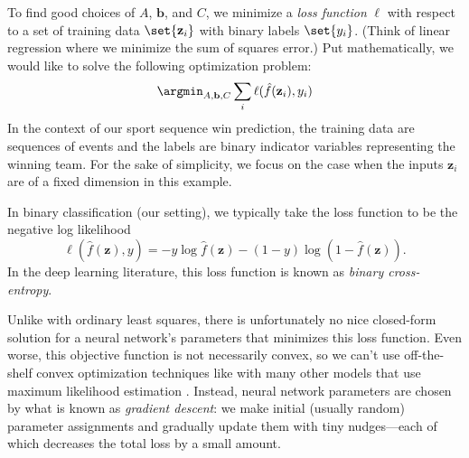 To find good choices of $A$, $\mathbf b$, and $C$, we minimize a \emph{loss function} $\ell$ with respect to a set of training data $\set{\mathbf z_i}$ with binary labels $\set{y_i}$. (Think of linear regression where we minimize the sum of squares error.) Put mathematically, we would like to solve the following optimization problem:
\begin{equation*}
	\argmin_{A, \mathbf b, C} \sum_i \ell(\hat f(\mathbf z_i), y_i)
\end{equation*}
In the context of our sport sequence win prediction, the training data are sequences of events and the labels are binary indicator variables representing the winning team. For the sake of simplicity, we focus on the case when the inputs $\mathbf z_i$ are of a fixed dimension in this example.

In binary classification (our setting), we typically take the loss function to be the negative log likelihood
\begin{equation}
	\label{eqn:bce-loss}
	\ell(\hat f(\mathbf z), y) = - y \log \hat f(\mathbf z) - (1 - y) \log (1 - \hat f(\mathbf z)).
\end{equation}
In the deep learning literature, this loss function is known as \emph{binary cross-entropy}.

Unlike with ordinary least squares, there is unfortunately no nice closed-form solution for a neural network's parameters that minimizes this loss function. Even worse, this objective function is not necessarily convex, so we can't use off-the-shelf convex optimization techniques like with many other models that use maximum likelihood estimation \cite[\S 13.4]{PML}.
Instead, neural network parameters are chosen by what is known as \emph{gradient descent}: we make initial (usually random) parameter assignments and gradually update them with tiny nudges---each of which decreases the total loss by a small amount.

